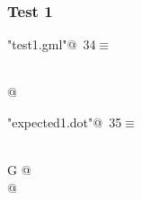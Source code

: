 \documentclass[a4paper]{report}
\begin{document}
\subsubsection{Test 1}
\begin{flushleft} \small
\begin{minipage}{\linewidth}\label{scrap34}\raggedright\small
{} \verb@"test1.gml"@\nobreak\ {\footnotesize {34}}$\equiv$
\vspace{-1ex}
\begin{list}{}{} \item
\mbox{}\verb@@\\
\mbox{}@\\
\mbox{}\verb@@{\NWsep}
\end{list}
\vspace{-1.5ex}
\footnotesize
\begin{list}{}{\setlength{\itemsep}{-\parsep}\setlength{\itemindent}{-\leftmargin}}

\item{}
\end{list}
\end{minipage}\vspace{4ex}
\end{flushleft}
\begin{flushleft} \small
\begin{minipage}{\linewidth}\label{scrap35}\raggedright\small
{} \verb@"expected1.dot"@\nobreak\ {\footnotesize {35}}$\equiv$
\vspace{-1ex}
\begin{list}{}{} \item
\mbox{}\verb@@\\
\mbox{}\verb@graph G {@\\
\mbox{}\verb@}@\\
\mbox{}\verb@@{\NWsep}
\end{list}
\vspace{-1.5ex}
\footnotesize
\begin{list}{}{\setlength{\itemsep}{-\parsep}\setlength{\itemindent}{-\leftmargin}}

\item{}
\end{list}
\end{minipage}\vspace{4ex}
\end{flushleft}
\newpage
\end{document}
